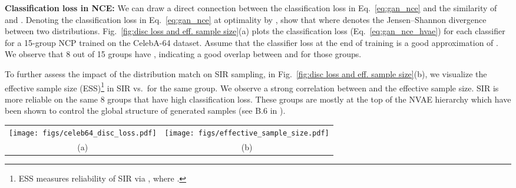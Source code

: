 \documentclass{article} \usepackage{iclr2021_conference,times}
\begin{document}
\textbf{Classification loss in NCE:}
We can draw a direct connection between the classification loss in Eq.~\ref{eq:gan_nce} and the similarity of  and . Denoting the classification loss in Eq.~\ref{eq:gan_nce} at optimality by , \citet{goodfellow_generative_2014} show that  where  denotes the Jensen–Shannon divergence between two distributions. 
Fig.~\ref{fig:disc loss and eff. sample size}(a) plots the classification loss (Eq.~\ref{eq:gan_nce_hvae}) for each classifier for a 15-group NCP trained on the CelebA-64 dataset. Assume that the classifier loss at the end of training is a good approximation of . We observe that 8 out of 15 groups have , indicating a good overlap between  and  for those groups. 
 
To further assess the impact of the distribution match on SIR sampling, in Fig.~\ref{fig:disc loss and eff. sample size}(b), we visualize the effective sample size (ESS)\footnote{ESS measures  reliability of SIR via , where  \citep{ownMCbook}.}  in SIR vs.\  for the same group. We observe a strong correlation between  and the effective sample size. SIR is more reliable on the same 8 groups that have high classification loss. These groups are mostly at the top of the NVAE hierarchy which have been shown to control the global structure of generated samples (see B.6 in \citet{vahdat2020NVAE}).

\begin{figure*}[t]
	\centering
	 \setlength\tabcolsep{0pt}
	 \renewcommand{\arraystretch}{-2}
	 \vspace{-0.2cm}
	\begin{tabular}{cc}
        \texttt{[image: figs/celeb64\_disc\_loss.pdf]}&
        \texttt{[image: figs/effective\_sample\_size.pdf]}\\
	    {\scriptsize (a)}&	{\scriptsize (b)}
	    \vspace{-2pt}
	    \end{tabular}
	\caption{ \textbf{(a)} Classification loss for binary classifiers on latent variable groups. A larger final loss upon training indicates that  and   are more similar. \textbf{(b)} The effective sample size vs.\ the final loss value at the end of training. Higher effective sample size implies similarity of two distributions. 
	}
	\label{fig:disc loss and eff. sample size}
	\vspace{-0.1cm}
\end{figure*}
\end{document}
